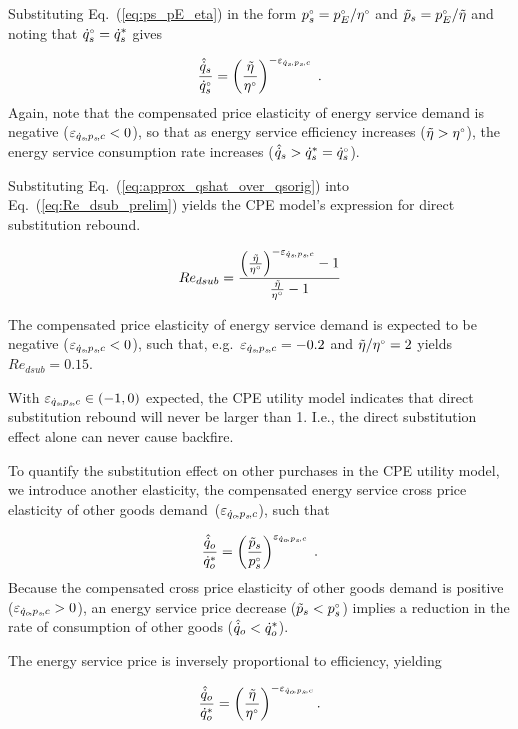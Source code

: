 Substituting Eq.~(\ref{eq:ps_pE_eta}) in the form
${}{p}^{\scriptscriptstyle \circ}_s = {}{p}^{\scriptscriptstyle \circ}_E/{}{\eta}^{\scriptscriptstyle \circ}$ and
$\tilde{p}_s = {}{p}^{\scriptscriptstyle \circ}_E/\tilde{\eta}$
and noting that ${}{\dot{q}}^{\scriptscriptstyle \circ}_s = {\dot{q}}^*_s$ gives

\begin{equation} \label{eq:approx_qshat_over_qsorig}
  \frac{\hat{\dot{q}}_s}{{}{\dot{q}}^{\scriptscriptstyle \circ}_s} = \left( \frac{\tilde{\eta}}{{}{\eta}^{\scriptscriptstyle \circ}} \right)^{-\varepsilon_{\dot{q}_s\!,p_s\!,c}} \; .
\end{equation}
%
Again, note that the compensated price elasticity of energy service demand
is negative ($\varepsilon_{\dot{q}_s\!,p_s\!,c} < 0$), so that
as energy service efficiency increases ($\tilde{\eta} > {}{\eta}^{\scriptscriptstyle \circ}$),
the energy service consumption rate increases ($\hat{\dot{q}}_s > {\dot{q}}^*_s = {}{\dot{q}}^{\scriptscriptstyle \circ}_s$).

Substituting Eq.~(\ref{eq:approx_qshat_over_qsorig}) into Eq.~(\ref{eq:Re_dsub_prelim})
yields the CPE model's expression for direct substitution rebound.

\begin{equation} \label{eq:Re_dsub_approx}
  Re_{dsub} = \frac{\left( \frac{\tilde{\eta}}{{}{\eta}^{\scriptscriptstyle \circ}} \right)^{-\varepsilon_{\dot{q}_s\!,p_s\!,c}} - 1} {\frac{\tilde{\eta}}{{}{\eta}^{\scriptscriptstyle \circ}} - 1}
\end{equation}

The compensated price elasticity of energy service demand is
expected to be negative ($\varepsilon_{\dot{q}_s\!,p_s\!,c} < 0$), 
such that, e.g.\
$\varepsilon_{\dot{q}_s\!,p_s\!,c} = -0.2$ and $\tilde{\eta}/{}{\eta}^{\scriptscriptstyle \circ} = 2$
yields $Re_{dsub} = 0.15$.

With $\varepsilon_{\dot{q}_s\!,p_s\!,c} \in (-1, 0)$ expected,
the CPE utility model indicates that
direct substitution rebound will never be larger than 1.
I.e., the direct substitution effect alone
can never cause backfire. 

To quantify the substitution effect on other purchases in the CPE utility model,
we introduce another elasticity,
the compensated energy service cross price elasticity of other goods demand~($\varepsilon_{\dot{q}_o\!,p_s\!,c}$), 
such that

\begin{equation}
  \frac{\hat{\dot{q}}_o}{{\dot{q}}^*_o} = \left( \frac{\tilde{p}_s}{{}{p}^{\scriptscriptstyle \circ}_s} \right) ^ {\varepsilon_{\dot{q}_o\!,p_s\!,c}} \; .
\end{equation}
%
Because the compensated cross price elasticity of other goods demand
is positive ($\varepsilon_{\dot{q}_o\!,p_s\!,c} > 0$),
an energy service price decrease ($\tilde{p}_s < {}{p}^{\scriptscriptstyle \circ}_s$)
implies a reduction in the rate of consumption of other goods ($\hat{\dot{q}}_o < {\dot{q}}^*_o$).

The energy service price is inversely proportional to 
efficiency, yielding

\begin{equation} \label{eq:qohat_qostar}
  \frac{\hat{\dot{q}}_o}{{\dot{q}}^*_o} = \left( \frac{\tilde{\eta}}{{}{\eta}^{\scriptscriptstyle \circ}} \right) ^ {-\varepsilon_{\dot{q}_o\!,p_s\!,c}} .
\end{equation}

